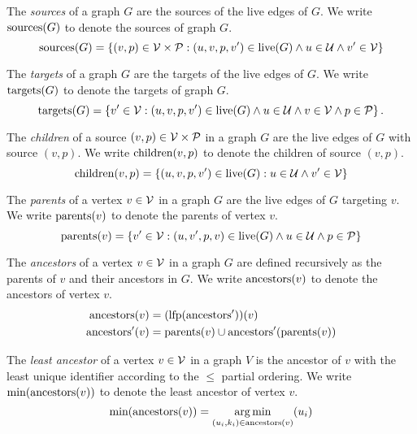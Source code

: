 \begin{definition}
  The \emph{sources} of a graph $G$ are the sources of the live edges of $G$.
  We write $\sources{G}$ to denote the sources of graph $G$.
  \[
    \sources{G} = \SetOf{(v, p) \in \V \times \P \SuchThat{(u, v, p, v') \in \live{G} \land u \in \U \land v' \in \V}}
  \]
\end{definition}

\begin{definition}
  The \emph{targets} of a graph $G$ are the targets of the live edges of $G$.
  We write $\targets{G}$ to denote the targets of graph $G$.
  \[
    \targets{G} = \SetOf{v' \in \V \SuchThat{(u, v, p, v') \in \live{G} \land u \in \U \land v \in \V \land p \in \P}}.
  \]
\end{definition}

\begin{definition}
  The \emph{children} of a source $(v, p) \in \V \times \P$ in a graph $G$
  are the live edges of $G$ with source $(v, p)$.
  We write $\children{v}{p}$ to denote the children of source $(v, p)$.
  \[
    \children{v}{p} = \SetOf{(u, v, p, v') \in \live{G} \SuchThat{u \in \U \land v' \in \V }}
  \]
\end{definition}

\begin{definition}
  The \emph{parents} of a vertex $v \in \V$ in a graph $G$ are the live edges of $G$ targeting $v$.
  We write $\parents{v}$ to denote the parents of vertex $v$.
  \[
    \parents{v} = \SetOf{v' \in \V \SuchThat{(u, v', p, v) \in \live{G} \land u \in \U \land p \in \P}}
  \]
\end{definition}

\begin{definition}
  The \emph{ancestors} of a vertex $v \in \V$ in a graph $G$ are defined recursively
  as the parents of $v$ and their ancestors in $G$.
  We write $\ancestors{v}$ to denote the ancestors of vertex $v$.
  \begin{align*}
    \ancestors{v} &= \mathopen{}\left( \lfp{\ancestorsPrimeOp} \right)\mathclose{}(v) \\
    \ancestorsPrime{v} &= \parents{v} \cup \ancestorsPrime{\parents{v}}
  \end{align*}
\end{definition}

\begin{definition}
  The \emph{least ancestor} of a vertex $v \in \V$ in a graph $V$ is the ancestor of $v$ with the least unique identifier according to the $\leq$ partial ordering.
  We write $\min{\ancestors{v}}$ to denote the least ancestor of vertex $v$.
  \[
    \min{\ancestors{v}} = \argmin{(u_i, k_i) \in \ancestors{v}}{u_i}
  \]
\end{definition}

